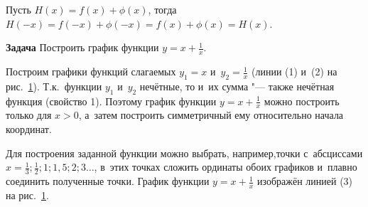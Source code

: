Пусть $H(x) = f(x) + \phi(x)$, тогда
$H(-x) = f(-x) + \phi(-x) = f(x) + \phi(x) = H(x)$.

\textbf{Задача}
Построить график функции $\displaystyle y = x + \frac{1}{x}$. \\

\begin{figure}\label{fig_1_8_17}
\end{figure}

Построим графики функций слагаемых $y_{1} = x$ и~$\displaystyle y_{2} = \frac{1}{x}$
(линии (1) и~(2) на рис.\ \ref{fig_1_8_17}). Т.к.\ функции $y_{1}$ и~$y_{2}$ нечётные,
то и~их сумма "--- также нечётная функция (свойство 1).
Поэтому график функции $\displaystyle y = x + \frac{1}{x}$ можно
построить только для $x > 0$, а~затем построить симметричный ему
относительно начала координат.

Для построения заданной функции можно выбрать, например,точки с~абсциссами
$\displaystyle x = \frac{1}{3}; \frac{1}{2}; 1; 1{,}5; 2; 3 \dots$,
в~этих точках сложить ординаты обоих графиков и~плавно соединить
полученные точки. График функции $\displaystyle y = x + \frac{1}{x}$
изображён линией (3) на рис.\ \ref{fig_1_8_17}.


